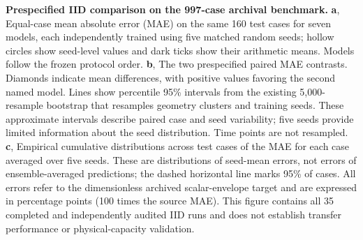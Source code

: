 \textbf{Prespecified IID comparison on the 997-case archival benchmark.}
\textbf{a}, Equal-case mean absolute error (MAE) on the same 160 test cases for seven models, each independently trained using five matched random seeds; hollow circles show seed-level values and dark ticks show their arithmetic means. Models follow the frozen protocol order.
\textbf{b}, The two prespecified paired MAE contrasts. Diamonds indicate mean differences, with positive values favoring the second named model. Lines show percentile 95\% intervals from the existing 5,000-resample bootstrap that resamples geometry clusters and training seeds. These approximate intervals describe paired case and seed variability; five seeds provide limited information about the seed distribution. Time points are not resampled.
\textbf{c}, Empirical cumulative distributions across test cases of the MAE for each case averaged over five seeds. These are distributions of seed-mean errors, not errors of ensemble-averaged predictions; the dashed horizontal line marks 95\% of cases.
All errors refer to the dimensionless archived scalar-envelope target and are expressed in percentage points (100 times the source MAE). This figure contains all 35 completed and independently audited IID runs and does not establish transfer performance or physical-capacity validation.
